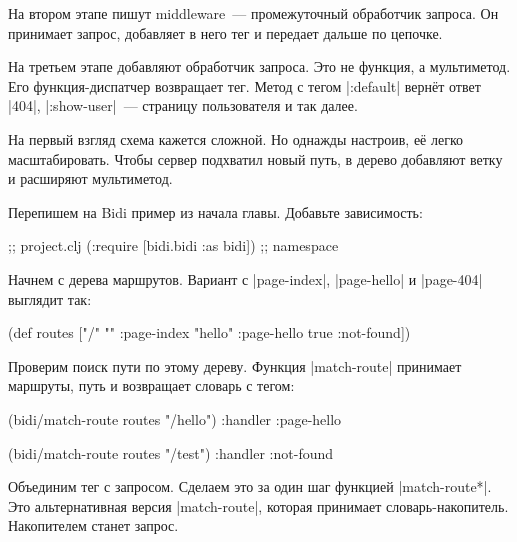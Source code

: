 На втором этапе пишут middleware~--- промежуточный обработчик запроса. Он
принимает запрос, добавляет в него тег и передает дальше по цепочке.

На третьем этапе добавляют обработчик запроса. Это не функция, а мультиметод.
Его функция-диспатчер возвращает тег. Метод с тегом \spverb|:default| верн\"{е}т
ответ \spverb|404|, \spverb|:show-user|~--- страницу пользователя и так далее.

На первый взгляд схема кажется сложной. Но однажды настроив, е\"{е} легко
масштабировать. Чтобы сервер подхватил новый путь, в дерево добавляют ветку и
расширяют мультиметод.


Перепишем на Bidi пример из начала главы. Добавьте зависимость:

\begin{english}
  \begin{clojure}
[bidi "2.1.5"]                  ;; project.clj
(:require [bidi.bidi :as bidi]) ;; namespace
  \end{clojure}
\end{english}

Начнем с дерева маршрутов. Вариант с \spverb|page-index|, \spverb|page-hello| и
\spverb|page-404| выглядит так:

\begin{english}
  \begin{clojure}
(def routes
  ["/" {""      :page-index
        "hello" :page-hello
        true    :not-found}])
  \end{clojure}
\end{english}


Проверим поиск пути по этому дереву. Функция \spverb|match-route| принимает
маршруты, путь и возвращает словарь с тегом:

\begin{english}
  \begin{clojure}
(bidi/match-route routes "/hello")
{:handler :page-hello}

(bidi/match-route routes "/test")
{:handler :not-found}
  \end{clojure}
\end{english}

Объединим тег с запросом. Сделаем это за один шаг функцией
\spverb|match-route*|. Это альтернативная версия \spverb|match-route|, которая
принимает словарь-накопитель. Накопителем станет запрос.

